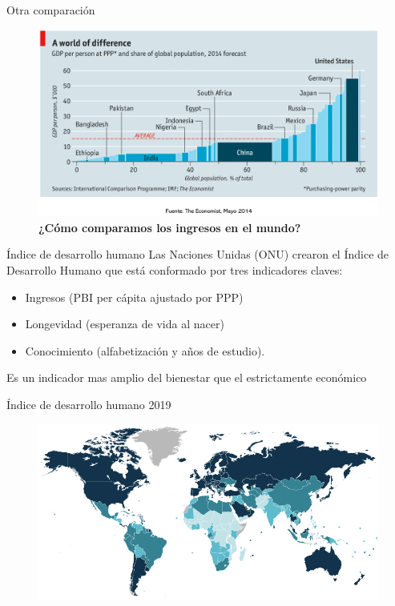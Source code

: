 \documentclass{beamer}
\begin{document}
\begin{frame}{Otra comparación}
    \begin{figure} [H]   \includegraphics[scale=0.4]{Slides Principios de Economia/Figures/C16.6.png}
\caption{\textbf{¿Cómo comparamos los ingresos en el mundo?}}
\label{fig:16.6}
\end{figure}

\end{frame}


\begin{frame}{Índice de desarrollo humano}
    Las Naciones Unidas (ONU) crearon el Índice de Desarrollo Humano que está conformado por tres indicadores claves: \vspace{1mm}
\begin{itemize}
    \item Ingresos (PBI per cápita ajustado por PPP) \vspace{1mm}
    \item Longevidad (esperanza de vida al nacer) \vspace{1mm}
    \item Conocimiento (alfabetización y años de estudio).
\end{itemize} \vspace{2mm}
    Es un indicador mas amplio del bienestar que el estrictamente económico

\end{frame}


\begin{frame}{Índice de desarrollo humano 2019}
\begin{figure} [H]  \includegraphics[scale=0.4]{Slides Principios de Economia/Figures/C16.7.png}
\end{figure}
\end{frame}
\end{document}
